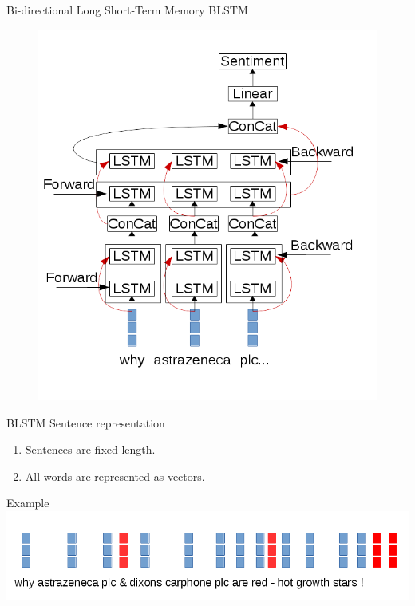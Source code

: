 \documentclass[10pt]{beamer}
\begin{document}
\begin{frame}[fragile]{Bi-directional Long Short-Term Memory BLSTM \cite{graves2005framewise}\cite{hochreiter1997long}}
\begin{figure}
\includegraphics[scale=0.3]{lstm_diagram.png}
\end{figure}
\end{frame}

\begin{frame}[fragile]{BLSTM Sentence representation}
\begin{enumerate}
\item Sentences are fixed length.
\item All words are represented as vectors.
\end{enumerate}
\begin{block}{Example}
\includegraphics[scale=0.4]{sentence_rep.png}
\end{block}

\end{frame}
\end{document}
